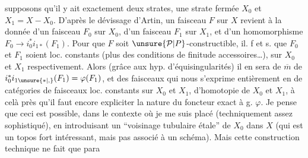 %
supposons qu'il y ait exactement deux strates, une strate fermée $X_0$ et $X_1=X-X_0$. D'après le dévissage d'Artin, un faisceau $F$ sur $X$ revient à la donnée d'un faisceau $F_0$  sur $X_0$, d'un faisceau $F_1$  sur $X_1$, et d'un homomorphisme $F_0\longrightarrow i_0^*i_{1*}(F_1)$. Pour que $F$
\reversemarginpar
{}%
\normalmarginpar
soit $\unsure{\mathcal P|P}$-constructible, il. f et s. que $F_0$ et $F_1$ soient loc. constants (plus des conditions de finitude accessoires\ldots), sur $X_0$ et $X_1$ respectivement. Alors (grâce aux hyp. d'équisingularités) il en sera de $\overline m$ de $i_0^*i_{1\unsure{*|,}}(F_1)=\varphi(F_1)$, et  des faisceaux qui nous  s'exprime entièrement en   de catégories de faisceaux loc. constants sur $X_0$ et $X_1$,   d'homotopie de $X_0$ et $X_1$, à celà près qu'il faut encore expliciter la nature du foncteur exact à g. $\varphi$. Je pense que ceci est possible, dans le contexte  où je me suis placé (techniquement assez sophistiqué), en introduisant un ``voisinage tubulaire étale'' de $X_0$ dans $X$ (qui est un topos fort intéressant, mais pas associé à un schéma). Mais cette construction technique ne fait que para%
